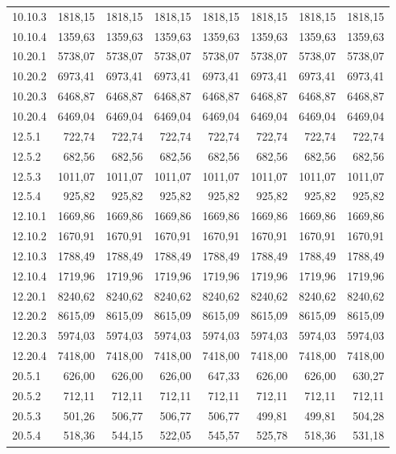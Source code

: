 \documentclass[../DoAn.tex]{subfiles}
\begin{document}
\begin{small}
\begin{longtable}{l|rrrrr|rr}
10.10.3 & 1818,15 & 1818,15 & 1818,15 & 1818,15 & 1818,15 & 1818,15 & 1818,15 \\
10.10.4 & 1359,63 & 1359,63 & 1359,63 & 1359,63 & 1359,63 & 1359,63 & 1359,63 \\
10.20.1 & 5738,07 & 5738,07 & 5738,07 & 5738,07 & 5738,07 & 5738,07 & 5738,07 \\
10.20.2 & 6973,41 & 6973,41 & 6973,41 & 6973,41 & 6973,41 & 6973,41 & 6973,41 \\
10.20.3 & 6468,87 & 6468,87 & 6468,87 & 6468,87 & 6468,87 & 6468,87 & 6468,87 \\
10.20.4 & 6469,04 & 6469,04 & 6469,04 & 6469,04 & 6469,04 & 6469,04 & 6469,04 \\
12.5.1 & 722,74 & 722,74 & 722,74 & 722,74 & 722,74 & 722,74 & 722,74 \\
12.5.2 & 682,56 & 682,56 & 682,56 & 682,56 & 682,56 & 682,56 & 682,56 \\
12.5.3 & 1011,07 & 1011,07 & 1011,07 & 1011,07 & 1011,07 & 1011,07 & 1011,07 \\
12.5.4 & 925,82 & 925,82 & 925,82 & 925,82 & 925,82 & 925,82 & 925,82 \\
12.10.1 & 1669,86 & 1669,86 & 1669,86 & 1669,86 & 1669,86 & 1669,86 & 1669,86 \\
12.10.2 & 1670,91 & 1670,91 & 1670,91 & 1670,91 & 1670,91 & 1670,91 & 1670,91 \\
12.10.3 & 1788,49 & 1788,49 & 1788,49 & 1788,49 & 1788,49 & 1788,49 & 1788,49 \\
12.10.4 & 1719,96 & 1719,96 & 1719,96 & 1719,96 & 1719,96 & 1719,96 & 1719,96 \\
12.20.1 & 8240,62 & 8240,62 & 8240,62 & 8240,62 & 8240,62 & 8240,62 & 8240,62 \\
12.20.2 & 8615,09 & 8615,09 & 8615,09 & 8615,09 & 8615,09 & 8615,09 & 8615,09 \\
12.20.3 & 5974,03 & 5974,03 & 5974,03 & 5974,03 & 5974,03 & 5974,03 & 5974,03 \\
12.20.4 & 7418,00 & 7418,00 & 7418,00 & 7418,00 & 7418,00 & 7418,00 & 7418,00 \\
20.5.1 & 626,00 & 626,00 & 626,00 & 647,33 & 626,00 & 626,00 & 630,27 \\
20.5.2 & 712,11 & 712,11 & 712,11 & 712,11 & 712,11 & 712,11 & 712,11 \\
20.5.3 & 501,26 & 506,77 & 506,77 & 506,77 & 499,81 & 499,81 & 504,28 \\
20.5.4 & 518,36 & 544,15 & 522,05 & 545,57 & 525,78 & 518,36 & 531,18 \\

\end{longtable}
\end{small}
\end{document}
